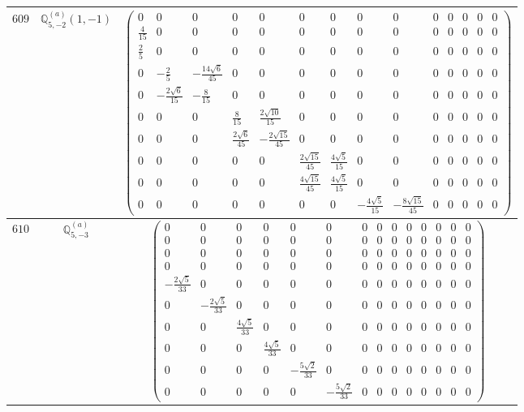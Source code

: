 \documentclass[fleqn,8pt,landscape]{jsarticle}
\begin{document}
\begin{center}
\begin{longtable}{ccc}
$ 609 $ & $ \mathbb{Q}_{5,-2}^{(a)}(1,-1) $ & $ \begin{pmatrix} 0 & 0 & 0 & 0 & 0 & 0 & 0 & 0 & 0 & 0 & 0 & 0 & 0 & 0 \\ \frac{4}{15} & 0 & 0 & 0 & 0 & 0 & 0 & 0 & 0 & 0 & 0 & 0 & 0 & 0 \\ \frac{2}{5} & 0 & 0 & 0 & 0 & 0 & 0 & 0 & 0 & 0 & 0 & 0 & 0 & 0 \\ 0 & - \frac{2}{5} & - \frac{14 \sqrt{6}}{45} & 0 & 0 & 0 & 0 & 0 & 0 & 0 & 0 & 0 & 0 & 0 \\ 0 & - \frac{2 \sqrt{6}}{15} & - \frac{8}{15} & 0 & 0 & 0 & 0 & 0 & 0 & 0 & 0 & 0 & 0 & 0 \\ 0 & 0 & 0 & \frac{8}{15} & \frac{2 \sqrt{10}}{15} & 0 & 0 & 0 & 0 & 0 & 0 & 0 & 0 & 0 \\ 0 & 0 & 0 & \frac{2 \sqrt{6}}{45} & - \frac{2 \sqrt{15}}{45} & 0 & 0 & 0 & 0 & 0 & 0 & 0 & 0 & 0 \\ 0 & 0 & 0 & 0 & 0 & \frac{2 \sqrt{15}}{45} & \frac{4 \sqrt{5}}{15} & 0 & 0 & 0 & 0 & 0 & 0 & 0 \\ 0 & 0 & 0 & 0 & 0 & \frac{4 \sqrt{15}}{45} & \frac{4 \sqrt{5}}{15} & 0 & 0 & 0 & 0 & 0 & 0 & 0 \\ 0 & 0 & 0 & 0 & 0 & 0 & 0 & - \frac{4 \sqrt{5}}{15} & - \frac{8 \sqrt{15}}{45} & 0 & 0 & 0 & 0 & 0 \end{pmatrix} $ \\ \hline
$ 610 $ & $ \mathbb{Q}_{5,-3}^{(a)} $ & $ \begin{pmatrix} 0 & 0 & 0 & 0 & 0 & 0 & 0 & 0 & 0 & 0 & 0 & 0 & 0 & 0 \\ 0 & 0 & 0 & 0 & 0 & 0 & 0 & 0 & 0 & 0 & 0 & 0 & 0 & 0 \\ 0 & 0 & 0 & 0 & 0 & 0 & 0 & 0 & 0 & 0 & 0 & 0 & 0 & 0 \\ 0 & 0 & 0 & 0 & 0 & 0 & 0 & 0 & 0 & 0 & 0 & 0 & 0 & 0 \\ - \frac{2 \sqrt{5}}{33} & 0 & 0 & 0 & 0 & 0 & 0 & 0 & 0 & 0 & 0 & 0 & 0 & 0 \\ 0 & - \frac{2 \sqrt{5}}{33} & 0 & 0 & 0 & 0 & 0 & 0 & 0 & 0 & 0 & 0 & 0 & 0 \\ 0 & 0 & \frac{4 \sqrt{5}}{33} & 0 & 0 & 0 & 0 & 0 & 0 & 0 & 0 & 0 & 0 & 0 \\ 0 & 0 & 0 & \frac{4 \sqrt{5}}{33} & 0 & 0 & 0 & 0 & 0 & 0 & 0 & 0 & 0 & 0 \\ 0 & 0 & 0 & 0 & - \frac{5 \sqrt{2}}{33} & 0 & 0 & 0 & 0 & 0 & 0 & 0 & 0 & 0 \\ 0 & 0 & 0 & 0 & 0 & - \frac{5 \sqrt{2}}{33} & 0 & 0 & 0 & 0 & 0 & 0 & 0 & 0 \end{pmatrix} $ \\ \hline

\end{longtable}
\end{center}
\end{document}
